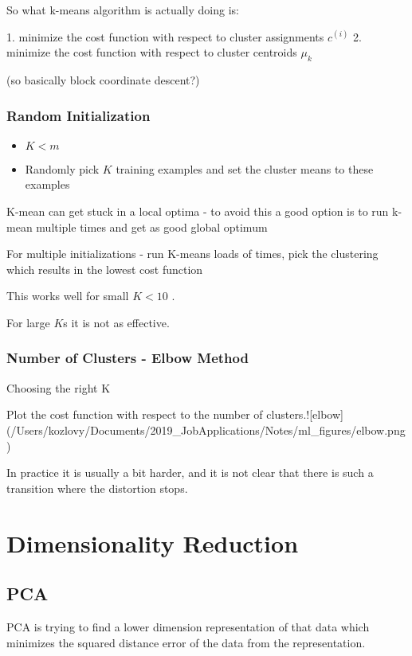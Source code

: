 {{{{{{So what k-means algorithm is actually doing is:

1. minimize the cost function with respect to cluster assignments $c^{(i)}$
2. minimize the cost function with respect to cluster centroids $\mu_k$ 

(so basically block coordinate descent?)

\subsubsection{Random Initialization}

\begin{itemize}
\item $K < m$
\item Randomly pick $K$ training examples and set the cluster means to these examples
\end{itemize}

K-mean can get stuck in a local optima - to avoid this a good option is to run k-mean multiple times and get as good global optimum

For multiple initializations - run K-means loads of times, pick the clustering which results in the lowest cost function

This works well for small $K < 10$ .

For large $K$s it is not as effective.

\subsubsection{Number of Clusters - Elbow Method}

Choosing the right K 

Plot the cost function with respect to the number of clusters.![elbow](/Users/kozlovy/Documents/2019_JobApplications/Notes/ml_figures/elbow.png)

In practice it is usually a bit harder, and it is not clear that there is such a transition where the distortion stops.

\section{Dimensionality Reduction}

\subsection{PCA}

PCA is trying to find a lower dimension representation of that data which minimizes the squared distance error of the data from the representation.

}}}}}}
